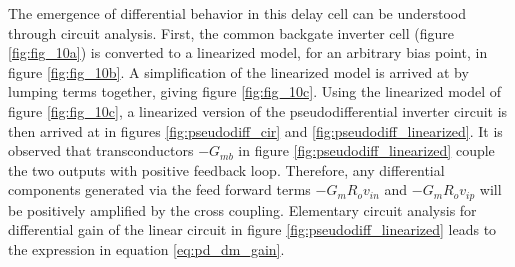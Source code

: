 		The emergence of differential behavior in this delay cell can be understood through circuit analysis. First, the common backgate inverter cell (figure \ref{fig:fig_10a}) is converted to a linearized model, for an arbitrary bias point, in figure \ref{fig:fig_10b}. A simplification of the linearized model is arrived at by lumping terms together, giving figure \ref{fig:fig_10c}. Using the linearized model of figure \ref{fig:fig_10c}, a linearized version of the pseudodifferential inverter circuit is then arrived at in figures \ref{fig:pseudodiff_cir} and \ref{fig:pseudodiff_linearized}. It is observed that transconductors $-G_{mb}$ in figure \ref{fig:pseudodiff_linearized} couple the two outputs with positive feedback loop. Therefore, any differential components generated via the feed forward terms $-G_m R_o v_{in}$ and $-G_m R_o v_{ip}$ will be positively amplified by the cross coupling. Elementary circuit analysis for differential gain of the linear circuit in figure \ref{fig:pseudodiff_linearized} leads to the expression in equation \ref{eq:pd_dm_gain}.

